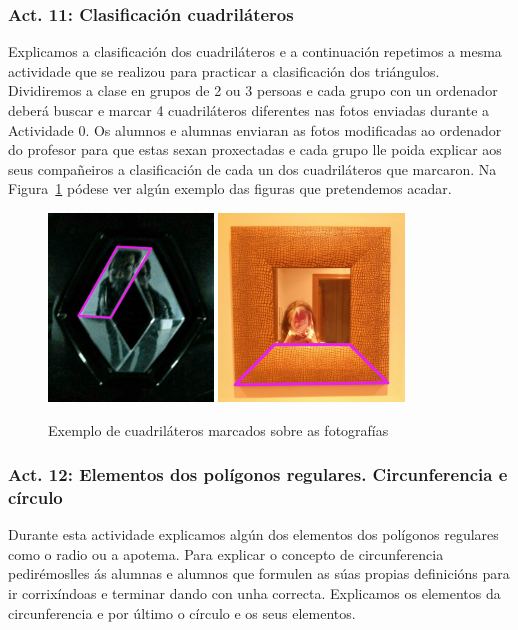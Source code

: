 \subsubsection{Act. 11: Clasificación cuadriláteros}\label{act11}
Explicamos a clasificación dos cuadriláteros e a continuación repetimos a mesma actividade que se realizou para practicar a clasificación dos triángulos.  Dividiremos a clase en grupos de 2 ou 3 persoas e cada grupo con un ordenador deberá buscar e marcar 4 cuadriláteros diferentes nas fotos enviadas durante a Actividade 0.
Os alumnos e alumnas enviaran as fotos modificadas ao ordenador do profesor para que estas sexan proxectadas e cada grupo lle poida explicar aos seus compañeiros a clasificación de cada un dos cuadriláteros que marcaron. Na Figura~\ref{fig:act11} pódese ver algún exemplo das figuras que pretendemos acadar.

\begin{figure}[h!]
  \centering
  \includegraphics[height=5cm]{img/cuad1.jpg}
  \includegraphics[height=5cm]{img/cuad2.jpg}
  \caption{Exemplo de cuadriláteros marcados sobre as fotografías}\label{fig:act11}
\end{figure}

\subsubsection{Act. 12: Elementos dos polígonos regulares. Circunferencia e círculo}
Durante esta actividade explicamos algún dos elementos dos polígonos regulares como o radio ou a apotema. Para explicar o concepto de circunferencia pedirémoslles ás alumnas e alumnos que formulen as súas propias definicións para ir corrixíndoas e terminar dando con unha correcta. Explicamos os elementos da circunferencia e por último o círculo e os seus elementos.

